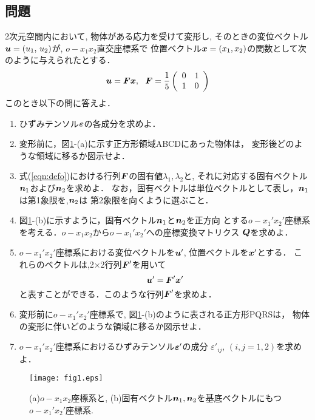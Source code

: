 \documentclass[10pt,a4j]{jarticle}
\begin{document}
\subsection{問題}
2次元空間内において, 物体がある応力を受けて変形し, 
そのときの変位ベクトル$\mbox{\boldmath $u$}=(u_1, \, u_2)$が, $o-x_1x_2$直交座標系で
位置ベクトル$\mbox{\boldmath $x$}=(x_1, x_2)$の関数として次のように与えられたとする．
\begin{equation}
	\fat{u}
	=
	\fat{F}\fat{x}
	, \ \ 
	\fat{F}=
	\frac{1}{5}
	\left( 
		\begin{array}{cc}
		 0 & 1\\
		 1 & 0 
		\end{array}
	\right)
	\label{eqn:defo}
\end{equation}
このとき以下の問に答えよ．
\begin{enumerate}
\item
	ひずみテンソル$\mbox{\boldmath $\varepsilon$}$の各成分を求めよ．
\item
	変形前に，図\ref{fig:fig6_1}-(a)に示す正方形領域ABCDにあった物体は，
	変形後どのような領域に移るか図示せよ．
\item
	式(\ref{eqn:defo})における行列$\mbox{\boldmath $F$}$の固有値$\lambda_1, \lambda_2$と, 
	それに対応する固有ベクトル$\mbox{\boldmath $n$}_1$および$\mbox{\boldmath $n$}_2$を求めよ．	
	なお，固有ベクトルは単位ベクトルとして表し，$\mbox{\boldmath $n$}_1$は第1象限を,$\mbox{\boldmath $n$}_2$は
	第2象限を向くように選ぶこと．
\item
	図\ref{fig:fig6_1}-(b)に示すように，固有ベクトル$\mbox{\boldmath $n$}_1$と$\mbox{\boldmath $n$}_2$を正方向
	とする$o-x_1'x_2'$座標系を考える．$o-x_1x_2$から$o-x_1'x_2'$への座標変換マトリクス
	$\mbox{\boldmath $Q$}$を求めよ．
\item
	$o-x_1'x_2'$座標系における変位ベクトルを$\mbox{\boldmath $u$}'$, 位置ベクトルを$\mbox{\boldmath $x$}'$とする．
	これらのベクトルは,2$\times$2行列$\mbox{\boldmath $F$}'$を用いて
	\[
		\mbox{\boldmath $u$}'=\mbox{\boldmath $F$}'\mbox{\boldmath $x$}'
	\]
	と表すことができる．このような行列$\mbox{\boldmath $F$}'$を求めよ．
\item
	変形前に$o-x_1'x_2'$座標系で, 図\ref{fig:fig6_1}-(b)のように表される正方形PQRSは，
	物体の変形に伴いどのような領域に移るか図示せよ．
\item
	$o-x_1'x_2'$座標系におけるひずみテンソル$\mbox{\boldmath $\varepsilon$}'$の成分
	$\varepsilon'_{ij}, \, (i,j=1,2)$を求めよ．
\end{enumerate}
\begin{figure}[h]
	\begin{center}
	\texttt{[image: fig1.eps]} 
	\end{center}
	\caption{(a)$o-x_1x_2$座標系と, (b)固有ベクトル$\mbox{\boldmath $n$}_1,\mbox{\boldmath $n$}_2$を基底ベクトルにもつ$o-x_1'x_2'$座標系.} 
	\label{fig:fig6_1}
\end{figure}

\end{document}
